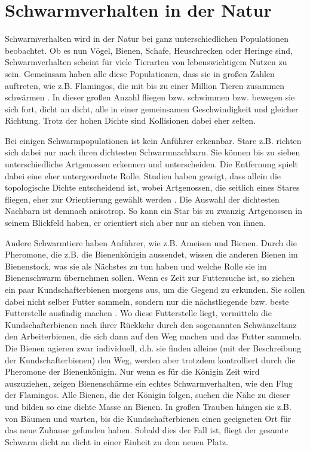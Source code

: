 \documentclass[draft=false
              ,paper=a4
              ,twoside=false
              ,fontsize=11pt
              ,headsepline
              ,BCOR10mm
              ,DIV11
              ,bibtotoc
              ,liststotoc
              ]{scrbook}
\begin{document}
\section{Schwarmverhalten in der Natur}
Schwarmverhalten wird in der Natur bei ganz unterschiedlichen Populationen beobachtet. Ob es nun Vögel, Bienen, Schafe, Heuschrecken oder Heringe sind, Schwarmverhalten scheint für viele Tierarten von lebenswichtigem Nutzen zu sein.
Gemeinsam haben alle diese Populationen, dass sie in großen Zahlen auftreten, wie z.B. Flamingos, die mit bis zu einer Million Tieren zusammen schwärmen \cite{flamingo}.
In dieser großen Anzahl fliegen bzw. schwimmen bzw. bewegen sie sich fort, dicht an dicht, alle in einer gemeinsamen Geschwindigkeit und gleicher Richtung. Trotz der hohen Dichte sind Kollisionen dabei eher selten.

Bei einigen Schwarmpopulationen ist kein Anführer erkennbar. Stare z.B. richten sich dabei nur nach ihren dichtesten Schwarmnachbarn. Sie können bis zu sieben unterschiedliche Artgenossen erkennen und unterscheiden. Die Entfernung spielt dabei eine eher untergeordnete Rolle. Studien haben gezeigt, dass allein die topologische Dichte entscheidend ist, wobei Artgenossen, die seitlich eines Stares fliegen, eher zur Orientierung gewählt werden \cite{Camperi715}. Die Auswahl der dichtesten Nachbarn ist demnach anisotrop. So kann ein Star bis zu zwanzig Artgenossen in seinem Blickfeld haben, er orientiert sich aber nur an sieben von ihnen.

Andere Schwarmtiere haben Anführer, wie z.B. Ameisen und Bienen. Durch die Pheromone, die z.B. die Bienenkönigin aussendet, wissen die anderen Bienen im Bienenstock, was sie als Nächstes zu tun haben und welche Rolle sie im Bienenschwarm übernehmen sollen. Wenn es Zeit zur Futtersuche ist, so ziehen ein paar Kundschafterbienen morgens aus, um die Gegend zu erkunden. Sie sollen dabei nicht selber Futter sammeln, sondern nur die nächstliegende bzw. beste Futterstelle ausfindig machen \cite{bees}. Wo diese Futterstelle liegt, vermitteln die Kundschafterbienen nach ihrer Rückkehr durch den sogenannten Schwänzeltanz den Arbeiterbienen, die sich dann auf den Weg machen und das Futter sammeln. Die Bienen agieren zwar individuell, d.h. sie finden alleine (mit der Beschreibung der Kundschafterbienen) den Weg, werden aber trotzdem kontrolliert durch die Pheromone der Bienenkönigin.
Nur wenn es für die Königin Zeit wird auszuziehen, zeigen Bienenschärme ein echtes Schwarmverhalten, wie den Flug der Flamingos. Alle Bienen, die der Königin folgen, suchen die Nähe zu dieser und bilden so eine dichte Masse an Bienen. In großen Trauben hängen sie z.B. von Bäumen und warten, bis die Kundschafterbienen einen geeigneten Ort für das neue Zuhause gefunden haben. Sobald dies der Fall ist, fliegt der gesamte Schwarm dicht an dicht in einer Einheit zu dem neuen Platz.
\end{document}
